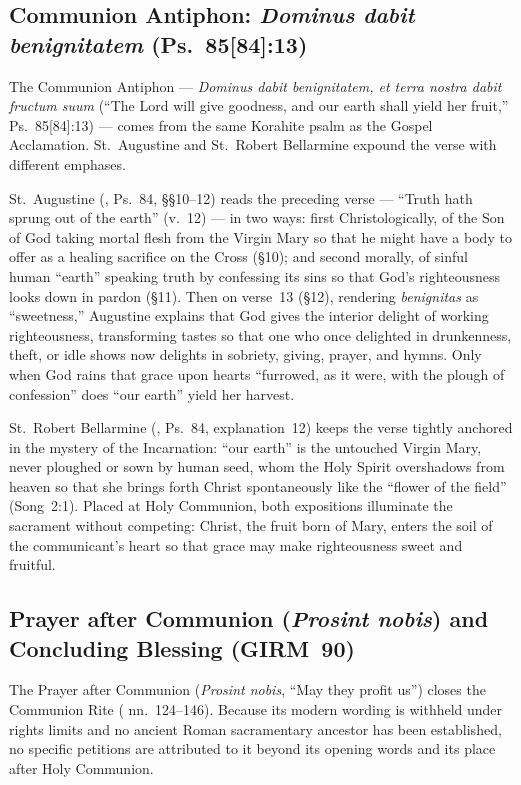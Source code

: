 \subsection{Communion Antiphon: \emph{Dominus dabit benignitatem} (Ps.~85[84]:13)}

The Communion Antiphon --- \emph{Dominus dabit benignitatem, et terra nostra dabit fructum suum} (``The Lord will give goodness, and our earth shall yield her fruit,'' Ps.~85[84]:13) --- comes from the same Korahite psalm as the Gospel Acclamation. St.~Augustine and St.~Robert Bellarmine expound the verse with different emphases.

St.~Augustine (, Ps.~84, §§10--12) reads the preceding verse --- ``Truth hath sprung out of the earth'' (v.~12) --- in two ways: first Christologically, of the Son of God taking mortal flesh from the Virgin Mary so that he might have a body to offer as a healing sacrifice on the Cross (§10); and second morally, of sinful human ``earth'' speaking truth by confessing its sins so that God's righteousness looks down in pardon (§11). Then on verse~13 (§12), rendering \emph{benignitas} as ``sweetness,'' Augustine explains that God gives the interior delight of working righteousness, transforming tastes so that one who once delighted in drunkenness, theft, or idle shows now delights in sobriety, giving, prayer, and hymns. Only when God rains that grace upon hearts ``furrowed, as it were, with the plough of confession'' does ``our earth'' yield her harvest.

St.~Robert Bellarmine (, Ps.~84, explanation~12) keeps the verse tightly anchored in the mystery of the Incarnation: ``our earth'' is the untouched Virgin Mary, never ploughed or sown by human seed, whom the Holy Spirit overshadows from heaven so that she brings forth Christ spontaneously like the ``flower of the field'' (Song~2:1). Placed at Holy Communion, both expositions illuminate the sacrament without competing: Christ, the fruit born of Mary, enters the soil of the communicant's heart so that grace may make righteousness sweet and fruitful.

\subsection{Prayer after Communion (\emph{Prosint nobis}) and Concluding Blessing (GIRM~90)}

The Prayer after Communion (\emph{Prosint nobis}, ``May they profit us'') closes the Communion Rite ( nn.~124--146). Because its modern wording is withheld under rights limits and no ancient Roman sacramentary ancestor has been established, no specific petitions are attributed to it beyond its opening words and its place after Holy Communion.

